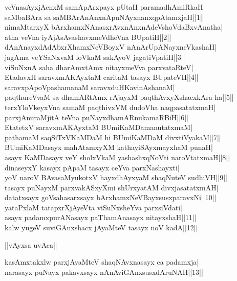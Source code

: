 \documentclass{article}
\begin{document}
veVnasAyxjAcnxM samApArxpayx pUtaH paramadhAmiRkaH|\\
saMbaBAra sa saMBArAnAnxnApuNAyxnanxqpAtamxjaH||1||\\
nimaMtarxyX bArxhamxNAnasxrAvxnAnxnAdeVshoVdaBxvAnatha|\\
atha veVna iyAjAsAvashavxmeVdheVna BUpatiH||2||\\
dAnAnayxdAdAbxrXhamxNeVBoyxV nAnArUpANayxneVkashaH|\\
jagAma veYSaNxvaM loVkaM sakAyoV jagatiVpatiH||3||\\
viSuNxnA saha dharAmxtAmx nitayxmeVva parxvataRteV|\\
EtadavxH saravxmAKAyxtaM caritaM tasayx BUpateVH||4||\\
saravxpApoVpashamanaM saravxduHKavinAshanaM|\\
paqthureVvaM sa dhamARtAmx rAjayxM paqthAvxyXshacxkAra ha||5||\\
terxYloVkeyxVna samaM paqthivxVM dudoVha naqpasatatxmaH|\\
parxjAnuraMjitA teVna puNayxdhamARnukamaRBiH||6||\\
EtatetxV saravxmAKAyxtaM BUmiKaMDamanutatxmaM|\\
pathamaM saqSiTxVKaMDaM hi BUmiKaMDaM divxtiVyakaM||7||\\
BUmiKaMDasayx mahAtamxyXM kathayiSAyxmayxhaM punaH|\\
asayx KaMDasayx veY sholxVkaM yashashxqNoVti naroVtatxmaH||8||\\
dinaseyxY kasayx pApaM tasayx ceYva parxNashayxti|\\
yoV naroV BAvasaMyukotxV hayxdhAyxyaM shaqNuteV sudhiVH||9||\\
tasayx puNayxM parxvakASxyXmi shUrxyatAM divxjasatatxmAH|\\
datatxsayx goVsahasarxsayx bArxhamxNeVBayxsusxparavxNi||10||\\
yataPxlaM tatapxrXjAyeVta viSuNxsheYva parxsiVdati|\\
asayx padamxpurANasayx paThamAnasayx nitayxshaH||11||\\
kalw yugeV suviGAnxshacx jAyaMteV tasayx noV kadA||12||\\

\begin{center}
||vAyxsa uvAca||
\end{center}

kasAmxtakxlw parxjAyaMteV shaqNAvxnasayx ca padamxja|\\
narasayx puNayx pakavxsayx nAnAviGAnxsusxdAruNAH||13||\\
\end{document}
